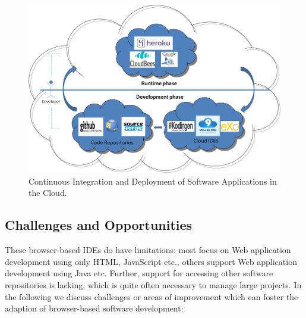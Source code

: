 \documentclass[11pt,fleqn,twoside]{article}
\begin{document}
\begin{figure}[h]
\begin{center}
\includegraphics[width=0.8\columnwidth]{fig/cloud_Dev_Deploy}
\end{center}
\vspace*{-4ex}
\caption{Continuous Integration and Deployment of Software Applications in the Cloud.}
\label{fig:cloudDevDeploy}
\end{figure}

\subsection{Challenges and Opportunities}
These browser-based IDEs do have limitations: most focus on Web application development using only HTML, JavaScript etc., others support Web application development using Java etc. Further, support for accessing other software repositories is lacking, which is quite often necessary to manage large projects. In the following we discuss challenges or areas of improvement which can foster the adaption of browser-based software development:
\end{document}
